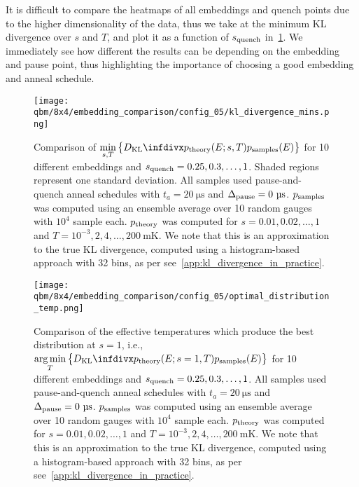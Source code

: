 It is difficult to compare the heatmaps of all embeddings and quench points due to the higher dimensionality of the data, thus we take at the minimum KL divergence over \( s \) and \( T \), and plot it as a function of \( s_{\text{quench}} \) in~\cref{fig:dkl_mins_embeddings}.
We immediately see how different the results can be depending on the embedding and pause point, thus highlighting the importance of choosing a good embedding and anneal schedule.

\begin{figure}[!htb]
    \begin{center}
        \texttt{[image: qbm/8x4/embedding\_comparison/config\_05/kl\_divergence\_mins.png]}
    \end{center}
    \caption{
        Comparison of \( \min\limits_{s,T}\big\{\DKL{\ptheory(E;s,T)}{\psamples(E)}\big\} \) for 10 different embeddings and \( s_{\text{quench}} = 0.25, 0.3, \dots, 1 \).
        Shaded regions represent one standard deviation.
        All samples used pause-and-quench anneal schedules with \( t_a = 20 \ \si{\micro\second} \) and \( \Deltapause = 0 \ \si{\micro\second} \).
        \( p_{\text{samples}} \) was computed using an ensemble average over 10 random gauges with \( 10^4 \) sample each.
        \( p_{\text{theory}} \) was computed for \( s = 0.01, 0.02, \dots, 1 \) and \( T = 10^{-3}, 2, 4, \dots, 200 \ \si{\milli\kelvin} \).
        We note that this is an approximation to the true KL divergence, computed using a histogram-based approach with 32 bins, as per see~\cref{app:kl_divergence_in_practice}.
    }
    \label{fig:dkl_mins_embeddings}
\end{figure}

\begin{figure}[!htb]
    \begin{center}
        \texttt{[image: qbm/8x4/embedding\_comparison/config\_05/optimal\_distribution\_temp.png]}
    \end{center}
    \caption{
        Comparison of the effective temperatures which produce the best distribution at \( s = 1 \), i.e., \( \argmin\limits_{T} \big\{\DKL{\ptheory(E;s=1,T)}{\psamples(E)}\big\} \) for 10 different embeddings and \( s_{\text{quench}} = 0.25, 0.3, \dots, 1 \).
        All samples used pause-and-quench anneal schedules with \( t_a = 20 \ \si{\micro\second} \) and \( \Deltapause = 0 \ \si{\micro\second} \).
        \( p_{\text{samples}} \) was computed using an ensemble average over 10 random gauges with \( 10^4 \) sample each.
        \( p_{\text{theory}} \) was computed for \( s = 0.01, 0.02, \dots, 1 \) and \( T = 10^{-3}, 2, 4, \dots, 200 \ \si{\milli\kelvin} \).
        We note that this is an approximation to the true KL divergence, computed using a histogram-based approach with 32 bins, as per see~\cref{app:kl_divergence_in_practice}.
    }
    \label{fig:optimal_distribution_temp}
\end{figure}

